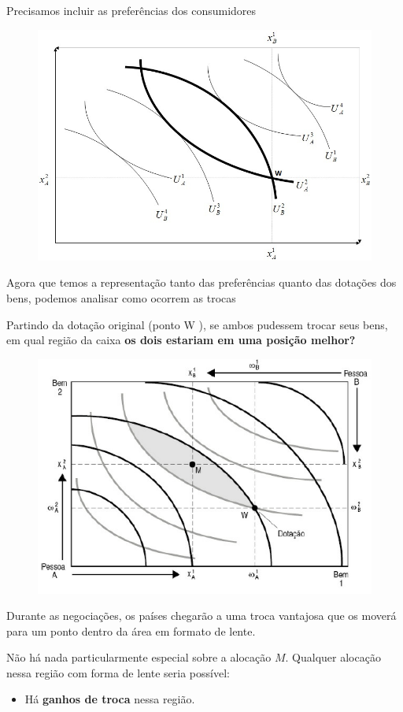 \documentclass[a4paper,12pt]{article}[abntex2]
\begin{document}
Precisamos incluir as preferências dos consumidores

\begin{figure}[H]
    \centering
    \includegraphics[width=0.70\linewidth]{Imagens/a2i2.png}
\end{figure}

Agora que temos a representação tanto das preferências quanto das dotações dos bens, podemos analisar como ocorrem as trocas

Partindo da dotação original (ponto W ), se ambos pudessem trocar seus bens, em qual região da caixa \textbf{os dois estariam em uma posição melhor?}

\begin{figure}[H]
    \centering
    \includegraphics[width=0.70\linewidth]{Imagens/a2i3.png}
\end{figure}

Durante as negociações, os países chegarão a uma troca vantajosa que os moverá para um ponto dentro da área em formato de lente.

Não há nada particularmente especial sobre a alocação $M$. Qualquer alocação nessa região com forma de lente seria possível:
\begin{itemize}
    \item Há \textbf{ganhos de troca} nessa região.
\end{itemize}
\end{document}
